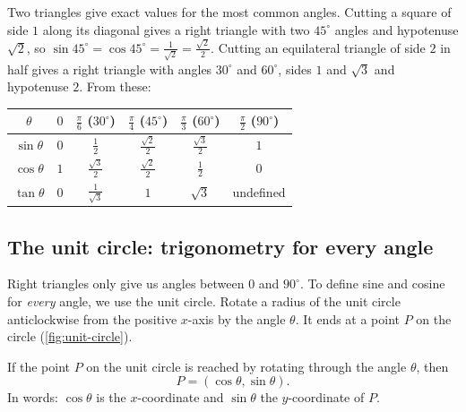 Two triangles give exact values for the most common angles. Cutting a square
of side $1$ along its diagonal gives a right triangle with two $45^\circ$
angles and hypotenuse $\sqrt2$, so $\sin45^\circ = \cos45^\circ =
\frac{1}{\sqrt2} = \frac{\sqrt2}{2}$. Cutting an equilateral triangle of side
$2$ in half gives a right triangle with angles $30^\circ$ and $60^\circ$, sides
$1$ and $\sqrt3$ and hypotenuse $2$. From these:
\begin{center}
\renewcommand{\arraystretch}{1.4}
\begin{tabular}{c|ccccc}
$\theta$ & $0$ & $\frac{\pi}{6}$ ($30^\circ$) & $\frac{\pi}{4}$ ($45^\circ$)
  & $\frac{\pi}{3}$ ($60^\circ$) & $\frac{\pi}{2}$ ($90^\circ$)\\
\hline
$\sin\theta$ & $0$ & $\frac12$ & $\frac{\sqrt2}{2}$ & $\frac{\sqrt3}{2}$ & $1$\\
$\cos\theta$ & $1$ & $\frac{\sqrt3}{2}$ & $\frac{\sqrt2}{2}$ & $\frac12$ & $0$\\
$\tan\theta$ & $0$ & $\frac{1}{\sqrt3}$ & $1$ & $\sqrt3$ & undefined
\end{tabular}
\end{center}

\subsection{The unit circle: trigonometry for every angle}

Right triangles only give us angles between $0$ and $90^\circ$. To define sine
and cosine for \emph{every} angle, we use the unit circle. Rotate a radius of
the unit circle anticlockwise from the positive $x$-axis by the angle $\theta$.
It ends at a point $P$ on the circle (\cref{fig:unit-circle}).

\begin{definition}\label{def:trig-circle}
If the point $P$ on the unit circle is reached by rotating through the angle
$\theta$, then
\[
  P = (\cos\theta, \sin\theta).
\]
In words: $\cos\theta$ is the $x$-coordinate and $\sin\theta$ the
$y$-coordinate of $P$.
\end{definition}

